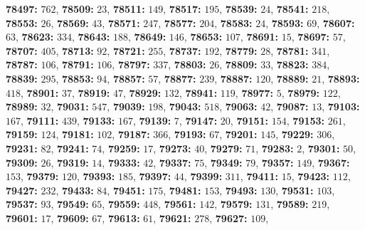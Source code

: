 \textsf{\bfseries 78497:} $762$, \textsf{\bfseries 78509:} $23$, \textsf{\bfseries 78511:} $149$, \textsf{\bfseries 78517:} $195$, \textsf{\bfseries 78539:} $24$, \textsf{\bfseries 78541:} $218$, \textsf{\bfseries 78553:} $26$, \textsf{\bfseries 78569:} $43$, \textsf{\bfseries 78571:} $247$, \textsf{\bfseries 78577:} $204$, \textsf{\bfseries 78583:} $24$, \textsf{\bfseries 78593:} $69$, \textsf{\bfseries 78607:} $63$, \textsf{\bfseries 78623:} $334$, \textsf{\bfseries 78643:} $188$, \textsf{\bfseries 78649:} $146$, \textsf{\bfseries 78653:} $107$, \textsf{\bfseries 78691:} $15$, \textsf{\bfseries 78697:} $57$, \textsf{\bfseries 78707:} $405$, \textsf{\bfseries 78713:} $92$, \textsf{\bfseries 78721:} $255$, \textsf{\bfseries 78737:} $192$, \textsf{\bfseries 78779:} $28$, \textsf{\bfseries 78781:} $341$, \textsf{\bfseries 78787:} $106$, \textsf{\bfseries 78791:} $106$, \textsf{\bfseries 78797:} $337$, \textsf{\bfseries 78803:} $26$, \textsf{\bfseries 78809:} $33$, \textsf{\bfseries 78823:} $384$, \textsf{\bfseries 78839:} $295$, \textsf{\bfseries 78853:} $94$, \textsf{\bfseries 78857:} $57$, \textsf{\bfseries 78877:} $239$, \textsf{\bfseries 78887:} $120$, \textsf{\bfseries 78889:} $21$, \textsf{\bfseries 78893:} $418$, \textsf{\bfseries 78901:} $37$, \textsf{\bfseries 78919:} $47$, \textsf{\bfseries 78929:} $132$, \textsf{\bfseries 78941:} $119$, \textsf{\bfseries 78977:} $5$, \textsf{\bfseries 78979:} $122$, \textsf{\bfseries 78989:} $32$, \textsf{\bfseries 79031:} $547$, \textsf{\bfseries 79039:} $198$, \textsf{\bfseries 79043:} $518$, \textsf{\bfseries 79063:} $42$, \textsf{\bfseries 79087:} $13$, \textsf{\bfseries 79103:} $167$, \textsf{\bfseries 79111:} $439$, \textsf{\bfseries 79133:} $167$, \textsf{\bfseries 79139:} $7$, \textsf{\bfseries 79147:} $20$, \textsf{\bfseries 79151:} $154$, \textsf{\bfseries 79153:} $261$, \textsf{\bfseries 79159:} $124$, \textsf{\bfseries 79181:} $102$, \textsf{\bfseries 79187:} $366$, \textsf{\bfseries 79193:} $67$, \textsf{\bfseries 79201:} $145$, \textsf{\bfseries 79229:} $306$, \textsf{\bfseries 79231:} $82$, \textsf{\bfseries 79241:} $74$, \textsf{\bfseries 79259:} $17$, \textsf{\bfseries 79273:} $40$, \textsf{\bfseries 79279:} $71$, \textsf{\bfseries 79283:} $2$, \textsf{\bfseries 79301:} $50$, \textsf{\bfseries 79309:} $26$, \textsf{\bfseries 79319:} $14$, \textsf{\bfseries 79333:} $42$, \textsf{\bfseries 79337:} $75$, \textsf{\bfseries 79349:} $79$, \textsf{\bfseries 79357:} $149$, \textsf{\bfseries 79367:} $153$, \textsf{\bfseries 79379:} $120$, \textsf{\bfseries 79393:} $185$, \textsf{\bfseries 79397:} $44$, \textsf{\bfseries 79399:} $311$, \textsf{\bfseries 79411:} $15$, \textsf{\bfseries 79423:} $112$, \textsf{\bfseries 79427:} $232$, \textsf{\bfseries 79433:} $84$, \textsf{\bfseries 79451:} $175$, \textsf{\bfseries 79481:} $153$, \textsf{\bfseries 79493:} $130$, \textsf{\bfseries 79531:} $103$, \textsf{\bfseries 79537:} $93$, \textsf{\bfseries 79549:} $65$, \textsf{\bfseries 79559:} $448$, \textsf{\bfseries 79561:} $142$, \textsf{\bfseries 79579:} $131$, \textsf{\bfseries 79589:} $219$, \textsf{\bfseries 79601:} $17$, \textsf{\bfseries 79609:} $67$, \textsf{\bfseries 79613:} $61$, \textsf{\bfseries 79621:} $278$, \textsf{\bfseries 79627:} $109$, 
